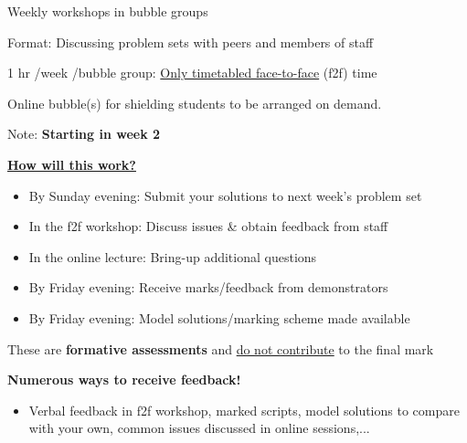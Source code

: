 \begin{frame}{Weekly workshops in bubble groups}

\begin{itemize}
{\small
\item Format: Discussing problem sets with peers and members of staff
\item 1 hr /week /bubble group: \underline{Only timetabled face-to-face} (f2f) time
\item Online bubble(s) for shielding students to be arranged on demand.
\item Note: {\bf Starting in week 2}
      \vspace{0.2cm}
\item \underline{\bf How will this work?}
\begin{itemize}
        \item By Sunday evening: Submit your solutions to next week's problem set
        \item In the f2f workshop: Discuss issues \& obtain feedback from staff
        \item In the online lecture: Bring-up additional questions
        \item By Friday evening: Receive marks/feedback from demonstrators
        \item By Friday evening: Model solutions/marking scheme made available
\end{itemize}
\vspace{0.2cm}
\item These are {\bf formative assessments} and \underline{do not contribute} to the final mark
\vspace{0.2cm}
\item {\bf Numerous ways to receive feedback!}
\begin{itemize}
        \item Verbal feedback in f2f workshop, marked scripts,
              model solutions to compare with your own,
              common issues discussed in online sessions,...
\end{itemize}

}
\end{itemize}

\end{frame}

